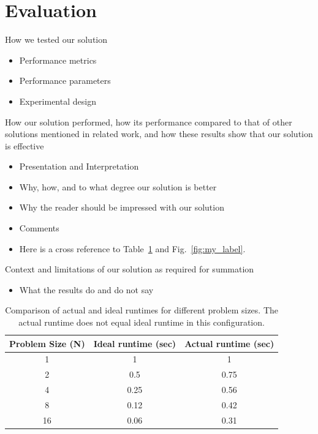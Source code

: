 \section{Evaluation}

How we tested our solution
\begin{itemize}
    \item Performance metrics
    \item Performance parameters
    \item Experimental design
\end{itemize}

How our solution performed, how its performance compared to that of other solutions mentioned in related work, and how these results show that our solution is effective
\begin{itemize}
    \item Presentation and Interpretation
    \item Why, how, and to what degree our solution is better
    \item Why the reader should be impressed with our solution
    \item Comments
    \item Here is a cross reference to Table~\ref{tab:my_label} and Fig.~\ref{fig:my_label}.
\end{itemize}

Context and limitations of our solution as required for summation
\begin{itemize}
    \item What the results do and do not say
\end{itemize}

\begin{table}[t!]
    \centering
    \begin{tabular}{c c c}
        Problem Size (N) & Ideal runtime (sec) & Actual runtime (sec) \\
        \hline 
        1 & 1 & 1 \\
        2 & 0.5 & 0.75 \\
        4 & 0.25 & 0.56 \\
        8 & 0.12 & 0.42 \\
        16 & 0.06 & 0.31 
    \end{tabular}
    \caption{Comparison of actual and ideal runtimes for different problem sizes. The actual runtime does not equal ideal runtime in this configuration.}
    \label{tab:my_label}
\end{table}


